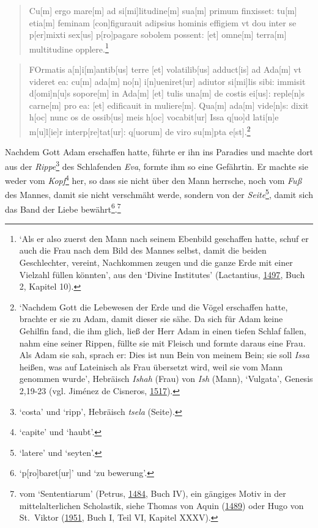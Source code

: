 \documentclass[
]{article}
\begin{document}
\begin{quote}
Cu{[}m{]} ergo mare{[}m{]} ad si{[}mi{]}litudine{[}m{]} sua{[}m{]}
primum finxisset: tu{[}m{]} etia{[}m{]} feminam {[}con{]}figurauit
adipsius hominis effigiem vt dou inter se p{[}er{]}mixti sex{[}us{]}
p{[}ro{]}pagare sobolem possent: {[}et{]} omne{[}m{]} terra{[}m{]}
multitudine opplere.\footnote{`Als er also zuerst den Mann nach seinem
  Ebenbild geschaffen hatte, schuf er auch die Frau nach dem Bild des
  Mannes selbst, damit die beiden Geschlechter, vereint, Nachkommen
  zeugen und die ganze Erde mit einer Vielzahl füllen könnten', aus den
  `Divine Institutes' (Lactantius,
  \href{https://books.google.com/books?id=qGsnghsi3uUC}{1497}, Buch 2,
  Kapitel 10).}
\end{quote}

\begin{quote}
FOrmatis a{[}n{]}i{[}m{]}antib{[}us{]} terre {[}et{]} volatilib{[}us{]}
adduct{[}is{]} ad Ada{[}m{]} vt videret ea: cu{[}m{]} ada{[}m{]}
no{[}n{]} i{[}n{]}ueniret{[}ur{]} adiutor si{[}mi{]}lis sibi: immisit
d{[}omi{]}n{[}u{]}s sopore{[}m{]} in Ada{[}m{]} {[}et{]} tulis
una{[}m{]} de costis ei{[}us{]}: reple{[}n{]}s carne{[}m{]} pro ea:
{[}et{]} edificauit in muliere{[}m{]}. Qua{[}m{]} ada{[}m{]}
vide{[}n{]}s: dixit h{[}oc{]} nunc os de ossib{[}us{]} meis h{[}oc{]}
vocabit{[}ur{]} Issa q{[}uo{]}d lati{[}n{]}e m{[}u{]}l{[}ie{]}r
interp{[}re{]}tat{[}ur{]}: q{[}uorum{]} de viro su{[}m{]}pta
e{[}st{]}.\footnote{`Nachdem Gott die Lebewesen der Erde und die Vögel
  erschaffen hatte, brachte er sie zu Adam, damit dieser sie sähe. Da
  sich für Adam keine Gehilfin fand, die ihm glich, ließ der Herr Adam
  in einen tiefen Schlaf fallen, nahm eine seiner Rippen, füllte sie mit
  Fleisch und formte daraus eine Frau. Als Adam sie sah, sprach er: Dies
  ist nun Bein von meinem Bein; sie soll \emph{Issa} heißen, was auf
  Lateinisch als Frau übersetzt wird, weil sie vom Mann genommen wurde',
  Hebräisch \emph{Ishah} (Frau) von \emph{Ish} (Mann), `Vulgata',
  Genesis 2,19-23 (vgl. Jiménez de Cisneros,
  \href{https://doi.org/10.3931/e-rara-46695}{1517}).}
\end{quote}

Nachdem Gott Adam erschaffen hatte, führte er ihn ins Paradies und
machte dort aus der \emph{Rippe}\footnote{`costa' und `ripp', Hebräisch
  \emph{tsela} (Seite).} des Schlafenden \emph{Eva}, formte ihm so eine
Gefährtin. Er machte sie weder vom \emph{Kopf}\footnote{`capite' und
  `haubt'.} her, so dass sie nicht über den Mann herrsche, noch vom
\emph{Fuß} des Mannes, damit sie nicht verschmäht werde, sondern von der
\emph{Seite}\footnote{`latere' und `seyten'.}, damit sich das Band der
Liebe bewährt\footnote{`p{[}ro{]}baret{[}ur{]}' und `zu bewerung'.}.\footnote{vom
  `Sententiarum' (Petrus,
  \href{https://doi.org/10.3931/e-rara-18241}{1484}, Buch IV), ein
  gängiges Motiv in der mittelalterlichen Scholastik, siehe Thomas von
  Aquin (\href{https://doi.org/10.3931/e-rara-15170}{1489}) oder Hugo
  von St.~Viktor
  (\href{https://archive.org/details/hugh-of-st.-victor-roy-j.-deferrari-on-the-sacraments-of-the-christian-faith-de-/mode/1up}{1951},
  Buch I, Teil VI, Kapitel XXXV).}
\end{document}
